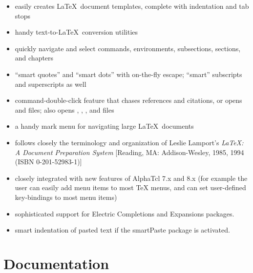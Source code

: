 \documentclass{report}
\begin{document}
\begin{itemize}
	\item easily creates \LaTeX\ document templates, complete with 
	indentation and tab stops

	\item handy text-to-\LaTeX\ conversion utilities

	\item quickly navigate and select commands, environments, 
	subsections, sections, and chapters

	\item ``smart quotes'' and ``smart dots'' with on-the-fly escape; 
	``smart'' subscripts and superscripts as well

	\item command-double-click feature that chases references and 
	citations, or opens  and  files; also 
	opens , , , 
	and  files

	\item a handy mark menu for navigating large \LaTeX\ documents

	\item follows closely the terminology and organization of Leslie 
	Lamport's \textsl{\LaTeX: A Document Preparation System} [Reading, 
	MA: Addison-Wesley, 1985, 1994 (ISBN 0-201-52983-1)]
	
    \item closely integrated with new features of AlphaTcl 7.x and
    8.x (for example the user can easily add menu items to most TeX
    menus, and can set user-defined key-bindings to most menu
    items)
	
	\item sophisticated support for Electric Completions and Expansions
	packages.
	
	\item smart indentation of pasted text if the smartPaste package is 
	activated.
\end{itemize}

\section{Documentation}
\label{sec:docs}
\end{document}
